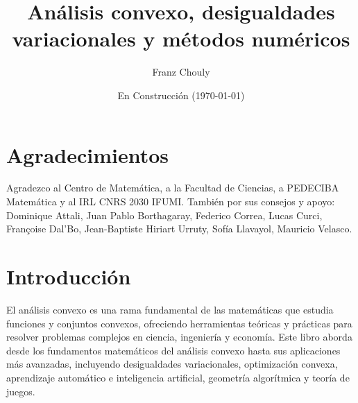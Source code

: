 \documentclass[12pt]{book}
\title{Análisis convexo, desigualdades variacionales y métodos numéricos}
\author{Franz Chouly}
\date{En Construcci\'on (\today)}
\theoremstyle{definition}
\theoremstyle{plain}
\theoremstyle{remark}
\begin{document}
\maketitle

\thispagestyle{empty}

\thispagestyle{plain}
\pagestyle{fancy}
\tableofcontents

\chapter*{Agradecimientos}

Agradezco al Centro de Matem\'atica, a la Facultad de Ciencias, a PEDECIBA Matem\'atica y al IRL CNRS 2030 IFUMI. Tambi\'en por sus consejos y apoyo:
Dominique Attali,
Juan Pablo Borthagaray,
Federico Correa,
Lucas Curci,
Fran\c{c}oise Dal'Bo,
Jean-Baptiste Hiriart Urruty,
Sof\'ia Llavayol,
Mauricio Velasco.




\chapter{Introducción}

El \textrm{análisis convexo} es una rama fundamental de las matemáticas que estudia funciones y conjuntos convexos, ofreciendo herramientas teóricas y prácticas para resolver problemas complejos en ciencia, ingeniería y economía. Este libro aborda desde los fundamentos matemáticos del análisis convexo hasta sus aplicaciones más avanzadas, incluyendo desigualdades variacionales, optimización convexa, aprendizaje automático e inteligencia artificial, geometría algorítmica y teoría de juegos.
\end{document}
